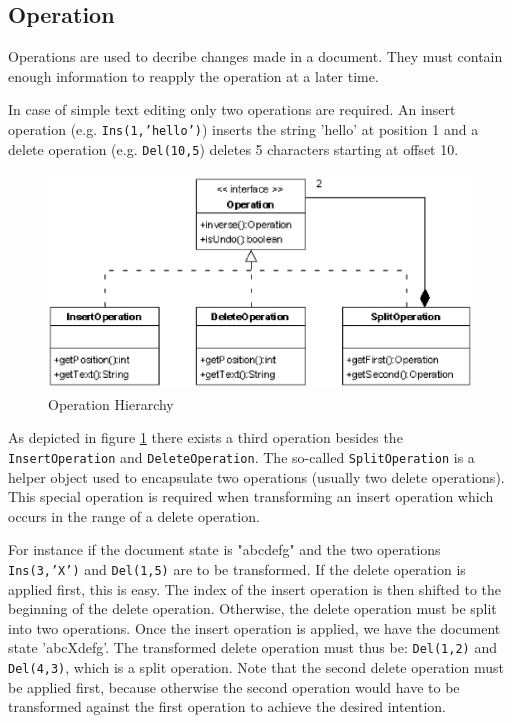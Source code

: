 \subsection{Operation}
Operations are used to decribe changes made in a document. They must contain
enough information to reapply the operation at a later time.

In case of simple text editing only two operations are required. An insert 
operation (e.g. \texttt{Ins(1,'hello')}) inserts the string 'hello' at position 
1 and a delete operation (e.g. \texttt{Del(10,5}) deletes 5 characters
starting at offset 10.

\begin{figure}[H]
\centering
\includegraphics[height=5.74cm,width=11.59cm]{../images/finalreport/algorithm_operation.eps}
\caption{Operation Hierarchy}
\label{Operation Hierarchy}
\end{figure}

\label{Split_Operation}
As depicted in figure \ref{Operation Hierarchy} there exists a third operation besides the \texttt{InsertOperation} and \texttt{DeleteOperation}. The so-called \texttt{SplitOperation} is a helper object used to encapsulate two operations (usually two delete operations). This special operation is required when transforming an insert operation which occurs in the range of a delete operation. 

For instance if the document state is "abcdefg" and the two operations
\texttt{Ins(3,'X')} and \texttt{Del(1,5)} are to be transformed. If
the delete operation is applied first, this is easy. The index of the insert
operation is then shifted to the beginning of the delete operation. Otherwise,
the delete operation must be split into two operations. Once the insert
operation is applied, we have the document state 'abcXdefg'. The transformed
delete operation must thus be: \texttt{Del(1,2)} and \texttt{Del(4,3)},
which is a split operation. Note that the second delete operation must be
applied first, because otherwise the second operation would have to be
transformed against the first operation to achieve the desired intention.

